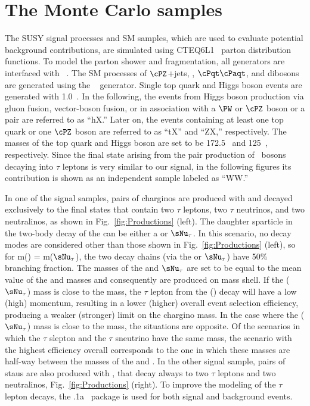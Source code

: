 \section{The Monte Carlo samples}
\label{sect:MCSamples}
The SUSY signal processes and SM samples, which are used to evaluate potential background contributions,
are simulated using CTEQ6L1~\cite{Nadolsky:2008zw} parton distribution functions.
To model the parton shower and fragmentation, all generators are interfaced with ~\cite{Sjostrand:2006za}.
The SM processes of $\cPZ$+jets, \wjets, $\cPqt\cPaqt$, and dibosons are generated using the ~\cite{Alwall:2011uj} generator.
Single top quark and Higgs boson events are generated with {\POWHEG} 1.0~\cite{Nason:2004rx,Frixione:2007vw,Alioli:2009je,Alioli:2010xd}.
In the following, the events from Higgs boson production via gluon fusion, vector-boson fusion, or in association with a $\PW$ or $\cPZ$  boson
or a \ttbar pair are referred to as ``hX.'' Later on,
the events containing at least one top quark or one $\cPZ$ boson are referred to as ``tX'' and ``ZX,'' respectively.
The masses of the top quark and Higgs boson are set to be 172.5\GeV~\cite{Khachatryan:2015hba} and 125\GeV~\cite{Aad:2015zhl}, respectively. Since the
final state arising from the pair production of \PW~bosons decaying into $\tau$ leptons is very similar
to our signal, in the following figures its contribution is shown as an independent sample labeled as ``WW.''

In one of the signal samples, pairs of charginos are produced with  and decayed exclusively to the final states that contain
two $\tau$ leptons, two $\tau$ neutrinos, and two neutralinos, as shown in Fig.~\ref{fig:Productions} (left).
The daughter sparticle in the two-body decay of the \PSGcpmDo can be either a \PSGt or $\sNu_{\tau}$.
In this scenario, no decay modes are considered other than those shown in Fig.~\ref{fig:Productions} (left), so for m(\PSGt) = m($\sNu_{\tau}$), the two decay chains
(via the \PSGt or $\sNu_{\tau}$) have 50\% branching fraction.
The masses of the \PSGt and $\sNu_{\tau}$ are set to be equal to the mean value of the \PSGcpmDo and \PSGczDo masses and consequently are produced on mass shell.
If the \PSGt ($\sNu_{\tau}$) mass is close to the \PSGczDo mass, the $\tau$ lepton from the \PSGt (\PSGcpmDo) decay will
have a low (high) momentum, resulting in a lower (higher) overall event selection efficiency,
producing a weaker (stronger) limit on the chargino mass.
In the case where the \PSGt ($\sNu_{\tau}$) mass is close to the \PSGcpmDo mass, the situations are opposite.
Of the scenarios in which the $\tau$ slepton and the $\tau$ sneutrino have the same mass, the scenario with the highest efficiency overall
corresponds to the one in which these masses are half-way between the masses of the \PSGcpmDo and \PSGczDo.
In the other signal sample, pairs of staus are also produced with ,
that decay always to two $\tau$ leptons and two neutralinos, Fig.~\ref{fig:Productions} (right).
To improve the modeling of the $\tau$ lepton decays, the .1a~\cite{Davidson:2010rw} package is used for both signal and background events.

